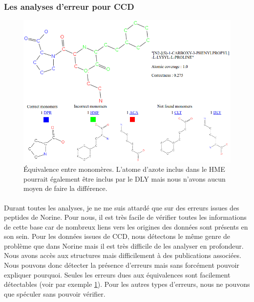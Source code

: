 \documentclass[12pt,french,twoside]{report}
\begin{document}
\subsubsection{Les analyses d'erreur pour CCD}

\begin{figure}[h!]
  \begin{center}
    \includegraphics[width=450px]{Figures/s2m/results/CCD_results.png}
    \caption{\label{CCD_results}Équivalence entre monomères.
    L'atome d'azote inclus dans le HME pourrait également être inclus par le DLY mais nous n'avons aucun moyen de faire la différence.}
  \end{center}
\end{figure}

\paragraph{}Durant toutes les analyses, je ne me suis attardé que sur des erreurs issues des peptides de Norine.
Pour nous, il est très facile de vérifier toutes les informations de cette base car de nombreux liens vers les origines des données sont présents en son sein.
Pour les données issues de CCD, nous détectons le même genre de problème que dans Norine mais il est très difficile de les analyser en profondeur.
Nous avons accès aux structures mais difficilement à des publications associées.
Nous pouvons donc détecter la présence d'erreurs mais sans forcément pouvoir expliquer pourquoi.
Seules les erreurs dues aux équivalences sont facilement détectables (voir par exemple \ref{CCD_results}).
Pour les autres types d'erreurs, nous ne pouvons que spéculer sans pouvoir vérifier.
\end{document}
